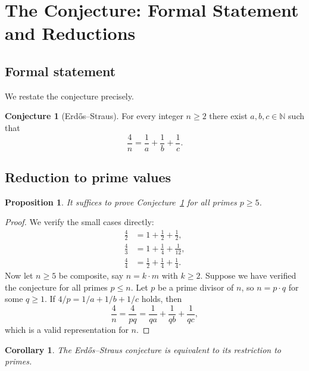 \documentclass[12pt,a4paper]{amsart}
\newtheorem{corollary}[theorem]{Corollary}
\newtheorem{proposition}[theorem]{Proposition}
\theoremstyle{definition}
\newtheorem{conjecture}[theorem]{Conjecture}
\newcommand{\N}{\mathbb{N}}
\begin{document}
\section{The Conjecture: Formal Statement and Reductions}

\subsection{Formal statement}

We restate the conjecture precisely.

\begin{conjecture}[Erd\H{o}s--Straus]\label{conj:ES2}
For every integer $n \geq 2$ there exist $a, b, c \in \N$ such that
\begin{equation}\label{eq:ES}
  \frac{4}{n} = \frac{1}{a} + \frac{1}{b} + \frac{1}{c}.
\end{equation}
\end{conjecture}

\subsection{Reduction to prime values}

\begin{proposition}\label{prop:prime-reduction}
It suffices to prove Conjecture~\ref{conj:ES2} for all primes $p \geq 5$.
\end{proposition}

\begin{proof}
We verify the small cases directly:
\begin{align*}
  \frac{4}{2} &= 1 + \frac{1}{2} + \frac{1}{2}, \\
  \frac{4}{3} &= 1 + \frac{1}{4} + \frac{1}{12}, \\
  \frac{4}{4} &= \frac{1}{2} + \frac{1}{4} + \frac{1}{4}.
\end{align*}
Now let $n \geq 5$ be composite, say $n = k \cdot m$ with $k \geq 2$.
Suppose we have verified the conjecture for all primes $p \leq n$.
Let $p$ be a prime divisor of $n$, so $n = p \cdot q$ for some $q \geq 1$.
If $4/p = 1/a + 1/b + 1/c$ holds, then
\[
  \frac{4}{n} = \frac{4}{pq} = \frac{1}{qa} + \frac{1}{qb} + \frac{1}{qc},
\]
which is a valid representation for $n$.
\end{proof}

\begin{corollary}
The Erd\H{o}s--Straus conjecture is equivalent to its restriction to primes.
\end{corollary}
\end{document}
